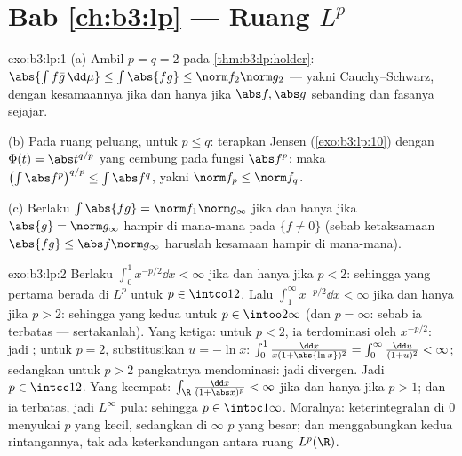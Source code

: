 \section*{Bab \ref{ch:b3:lp} --- Ruang $L^p$}

\begin{solution}{exo:b3:lp:1}
(a) Ambil $p = q = 2$ pada \cref{thm:b3:lp:holder}: $\abs{\int f\bar
g\,\dd\mu} \leq \int\abs{fg} \leq \norm f_2\norm g_2$ ---
yakni Cauchy--Schwarz, dengan kesamaannya jika dan hanya jika $\abs f, \abs g$
sebanding dan fasanya sejajar.

(b) Pada ruang peluang, untuk $p \leq q$: terapkan Jensen
(\cref{exo:b3:lp:10}) dengan $\Phi(t) =
\abs t^{q/p}$ yang cembung pada fungsi $\abs f^p$:
maka $\bigl(\int\abs f^p\bigr)^{q/p} \leq \int\abs f^q$, yakni
$\norm f_p \leq \norm f_q$.

(c) Berlaku $\int\abs{fg} = \norm f_1\norm g_\infty$ jika dan hanya jika $\abs{g} =
\norm g_\infty$ hampir di mana-mana pada $\{f \neq 0\}$ (sebab ketaksamaan
$\abs{fg} \leq \abs f\norm g_\infty$ haruslah kesamaan hampir
di mana-mana).
\end{solution}

\begin{solution}{exo:b3:lp:2}
Berlaku $\int_0^1 x^{-p/2}\dd x < \infty$ jika dan hanya jika $p < 2$: sehingga yang pertama berada di
$L^p$ untuk $p \in \intco12$. Lalu $\int_1^\infty x^{-p/2}\dd x <
\infty$ jika dan hanya jika $p > 2$: sehingga yang kedua untuk $p \in \intoo2\infty$ (dan
$p = \infty$: sebab ia terbatas --- sertakanlah). Yang ketiga: untuk $p <
2$, ia terdominasi oleh $x^{-p/2}$: jadi ; untuk $p = 2$,
substitusikan $u = -\ln x$: $\int_0^1\frac{\dd x}{x(1 + \abs{\ln
x})^2} = \int_0^\infty\frac{\dd u}{(1 + u)^2} < \infty$; sedangkan untuk
$p > 2$ pangkatnya mendominasi: jadi divergen. Jadi $p \in \intcc12$.
Yang keempat: $\int_\R\frac{\dd x}{(1 + \abs x)^p} < \infty$ jika dan hanya jika $p >
1$; dan ia terbatas, jadi $L^\infty$ pula: sehingga $p \in
\intoc1\infty$. Moralnya: keterintegralan di $0$ menyukai $p$ yang kecil, sedangkan di
$\infty$ $p$ yang besar; dan menggabungkan kedua rintangannya, tak ada keterkandungan
antara ruang $L^p(\R)$.
\end{solution}

